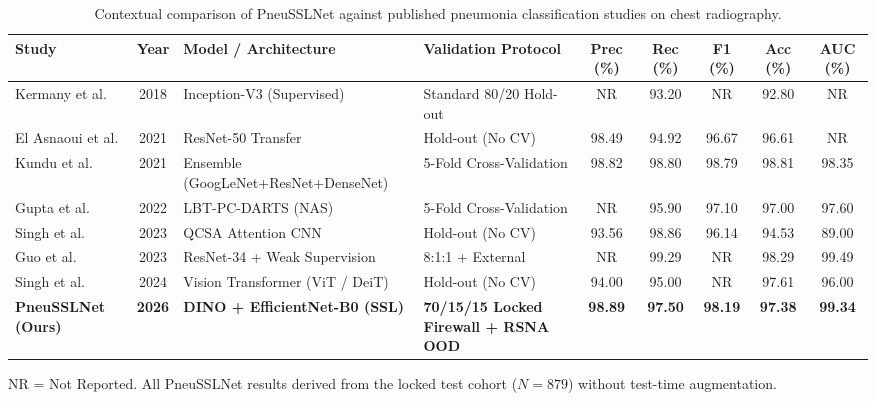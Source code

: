 \documentclass[journal,article,submit,moreauthors,pdftex]{Definitions/tsp}
\begin{document}
\begin{table}[t]
\tablesize{\scriptsize}
\centering
\caption{Contextual comparison of PneuSSLNet against published pneumonia classification studies on chest radiography.}
\label{tab:sota_comparison}
\begin{threeparttable}
\begin{adjustbox}{max width=\textwidth}
\begin{tabular}{l c p{3.2cm} p{3.0cm} c c c c c}
\toprule
\textbf{Study} & \textbf{Year} & \textbf{Model / Architecture} & \textbf{Validation Protocol} & \textbf{Prec (\%)} & \textbf{Rec (\%)} & \textbf{F1 (\%)} & \textbf{Acc (\%)} & \textbf{AUC (\%)} \\
\midrule
Kermany et al. \cite{Kermany18} & 2018 & Inception-V3 (Supervised) & Standard 80/20 Hold-out & NR & 93.20 & NR & 92.80 & NR \\
El Asnaoui et al. \cite{ElAsnaoui21} & 2021 & ResNet-50 Transfer & Hold-out (No CV) & 98.49 & 94.92 & 96.67 & 96.61 & NR \\
Kundu et al. \cite{Kundu21} & 2021 & Ensemble (GoogLeNet+ResNet+DenseNet) & 5-Fold Cross-Validation & 98.82 & 98.80 & 98.79 & 98.81 & 98.35 \\
Gupta et al. \cite{Gupta22} & 2022 & LBT-PC-DARTS (NAS) & 5-Fold Cross-Validation & NR & 95.90 & 97.10 & 97.00 & 97.60 \\
Singh et al. \cite{Singh23} & 2023 & QCSA Attention CNN & Hold-out (No CV) & 93.56 & 98.86 & 96.14 & 94.53 & 89.00 \\
Guo et al. \cite{Guo23} & 2023 & ResNet-34 + Weak Supervision & 8:1:1 + External & NR & 99.29 & NR & 98.29 & 99.49 \\
Singh et al. \cite{Singh24} & 2024 & Vision Transformer (ViT / DeiT) & Hold-out (No CV) & 94.00 & 95.00 & NR & 97.61 & 96.00 \\
\midrule
\textbf{PneuSSLNet (Ours)} & \textbf{2026} & \textbf{DINO + EfficientNet-B0 (SSL)} & \textbf{70/15/15 Locked Firewall + RSNA OOD} & \textbf{98.89} & \textbf{97.50} & \textbf{98.19} & \textbf{97.38} & \textbf{99.34} \\
\bottomrule
\end{tabular}
\end{adjustbox}
\begin{tablenotes}
\item NR = Not Reported. All PneuSSLNet results derived from the locked test cohort ($N=879$) without test-time augmentation.
\end{tablenotes}
\end{threeparttable}
\end{table}
\end{document}
